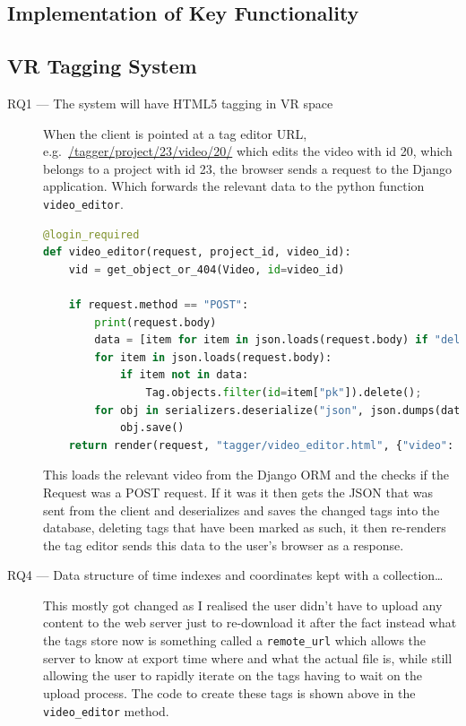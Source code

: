 \documentclass[12pt]{report}
\newcommand{\inlinecode}{\texttt}
\begin{document}
\subsection{Implementation of Key Functionality}
\subsection{VR Tagging System}

\begin{description}
    \item[RQ1 --- The system will have HTML5 tagging in VR space]
        When the client is pointed at a tag editor URL, e.g.\
        \url{/tagger/project/23/video/20/} which edits the video with id 20,
        which belongs to a project with id 23, the browser sends a request to
        the Django application. Which forwards the relevant data to the python
        function \inlinecode{video\_editor}.
        \begin{lstlisting}[language=Python, breaklines=true]
@login_required
def video_editor(request, project_id, video_id):
    vid = get_object_or_404(Video, id=video_id)

    if request.method == "POST":
        print(request.body)
        data = [item for item in json.loads(request.body) if "deleted" not in item]
        for item in json.loads(request.body):
            if item not in data:
                Tag.objects.filter(id=item["pk"]).delete();
        for obj in serializers.deserialize("json", json.dumps(data)):
            obj.save()
    return render(request, "tagger/video_editor.html", {"video": vid, "tags": vid.tag_set, "tags_json": serializers.serialize("json", vid.tag_set.all())})
        \end{lstlisting}
        This loads the relevant video from the Django ORM and the checks if the
        Request was a POST request. If it was it then gets the JSON that was
        sent from the client and deserializes and saves the changed tags into
        the database, deleting tags that have been marked as such, it then
        re-renders the tag editor sends this data to the user's browser as a
        response.

    \item[RQ4 --- Data structure of time indexes and coordinates kept with a
        collection\ldots]
        This mostly got changed as I realised the user didn't have to upload
        any content to the web server just to re-download it after the fact
        instead what the tags store now is something called a
        \inlinecode{remote\_url} which allows the server to know at export time
        where and what the actual file is, while still allowing the user to
        rapidly iterate on the tags having to wait on the upload process. The
        code to create these tags is shown above in the \inlinecode{video\_editor} method.


\end{description}
\end{document}
